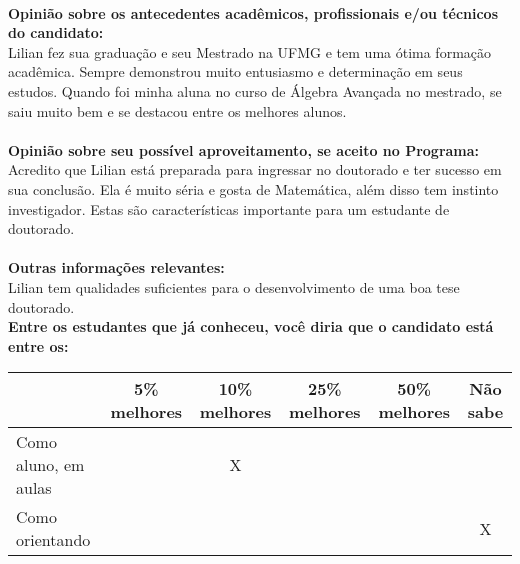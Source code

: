\documentclass[11pt]{article}
\begin{document}
\\
\textbf{Opinião sobre os antecedentes acadêmicos, profissionais e/ou técnicos do candidato:}
\\Lilian fez sua graduação e seu Mestrado na UFMG e tem uma ótima formação acadêmica. Sempre demonstrou muito entusiasmo e determinação em seus estudos. Quando foi minha aluna no curso de Álgebra Avançada no mestrado, se saiu muito bem e se destacou entre os melhores alunos.\\
\\
\textbf{Opinião sobre seu possível aproveitamento, se aceito no Programa:}
\\Acredito que Lilian está preparada para ingressar no doutorado e ter sucesso em sua conclusão. Ela é muito séria e gosta de Matemática, além disso tem instinto investigador. Estas são características importante para um estudante de doutorado.\\ 
\\
\textbf{Outras informações relevantes:} \\Lilian tem qualidades suficientes para o desenvolvimento de uma boa tese doutorado.
\\[0.3cm]
\textbf{Entre os estudantes que já conheceu, você diria que o candidato está entre os:}
\\
\begin{tabular}{|l|c|c|c|c|c|}
\hline
 & 5\% melhores & 10\% melhores & 25\% melhores & 50\% melhores & Não sabe \\
\hline
Como aluno, em aulas &  & X &  &  & \\
\hline
Como orientando &  &  &  &  & X\\
\hline
\end{tabular}
\end{document}
